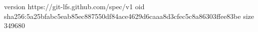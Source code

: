 version https://git-lfs.github.com/spec/v1
oid sha256:5a25bfabc5eab85ec887550df84ace4629d6caaa8d3cfec5c8a86303ffee83be
size 349680
